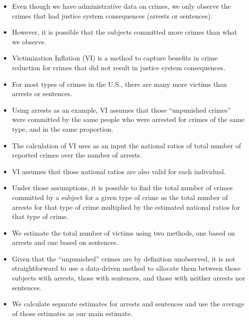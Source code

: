 \documentclass[static]{JJH-Beamer}
\begin{document}
\begin{frame}
 \addtocounter{framenumber}{-1}

\begin{itemize}
\item Even though we have administrative data on crimes, we only observe the crimes that had justice system consequences (arrests or sentences).
\item However, it is possible that the subjects committed more crimes than what we observe.
\item Victimization Inflation (VI) is a method to capture benefits in crime reduction for crimes that did not result in justice system consequences.
\item For most types of crimes in the U.S., there are many more victims than arrests or sentences.
\item Using arrests as an example, VI assumes that those ``unpunished crimes'' were committed by the same people who were arrested for crimes of the same type, and in the same proportion.
\item The calculation of VI uses as an input the national ratios of total number of reported crimes over the number of arrests.
\end{itemize}

\end{frame}

\begin{frame}
 \addtocounter{framenumber}{-1}

\begin{itemize}
\item VI assumes that those national ratios are also valid for each individual.
\item Under those assumptions, it is possible to find the total number of crimes committed by a subject for a given type of crime as the total number of arrests for that type of crime multiplied by the estimated national ratios for that type of crime.
\item We estimate the total number of victims using two methods, one based on arrests and one based on sentences.
\item Given that the ``unpunished'' crimes are by definition unobserved, it is not straightforward to use a data-driven method to allocate them between those subjects with arrests, those with sentences, and those with neither arrests nor sentences.
\item We calculate separate estimates for arrests and sentences and use the average of those estimates as our main estimate.
\end{itemize}

\end{frame}
\end{document}
